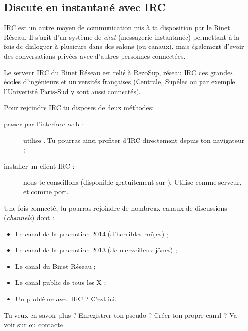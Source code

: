 %
\subsection{Discute en instantané avec IRC}

\label{irc}

IRC est un autre moyen de communication mis à ta disposition par le Binet Réseau.
Il s'agit d'un système de \emph{chat} (messagerie instantanée) permettant à la fois de dialoguer à plusieurs dans des salons (ou canaux),
mais également d'avoir des conversations privées avec d'autres personnes connectées.


Le serveur IRC du Binet Réseau est relié à RezoSup, réseau IRC des grandes écoles d'ingénieurs et universités françaises (Centrale, Supélec ou par exemple l'Univeristé Paris-Sud y sont aussi connectés).

Pour rejoindre IRC tu disposes de deux méthodes:

                  
\begin{description}
  \item[passer par l'interface web :] utilise . Tu pourras ainsi profiter d'IRC directement depuis ton navigateur ;
  \item[installer un client IRC :] nous te conseillons  (disponible gratuitement sur \linebreak {}). Utilise   comme serveur, et  comme port.
\end{description}

 
Une fois connecté, tu pourras rejoindre de nombreux canaux de discussions (\emph{channels}) dont :
\begin{itemize}
  \item {} Le canal de la promotion 2014 (d'horribles roûjes) ;
   \item {} Le canal de la promotion 2013 (de merveilleux jônes) ;
  \item {} Le canal du Binet Réseau ;
  \item {} Le canal public de tous les X ;
  \item {} Un problème avec IRC ? C'est ici.
\end{itemize}

 Tu veux en savoir plus ? Enregistrer ton pseudo ? Créer ton propre canal ? Va voir sur  ou contacte .


